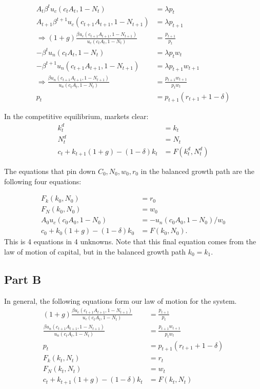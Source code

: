 \documentclass[11pt]{article} %
\begin{document}
\begin{align*}
A_t\beta^tu_c(c_tA_t,1-N_t) &= \lambda p_t\\
A_{t+1}\beta^{t+1}u_c(c_{t+1}A_{t+1},1-N_{t+1}) &= \lambda p_{t+1}\\
\Rightarrow (1+g)\frac{\beta u_c(c_{t+1}A_{t+1},1-N_{t+1})}{ u_c(c_tA_t,1-N_t)} &= \frac{p_{t+1}}{p_t}\\
-\beta^tu_n(c_tA_t,1-N_t) &= \lambda p_tw_t \\
-\beta^{t+1}u_n(c_{t+1}A_{t+1},1-N_{t+1}) &= \lambda p_{t+1}w_{t+1}\\
\Rightarrow \frac{\beta u_n(c_{t+1}A_{t+1},1-N_{t+1}) }{u_n(c_tA_t,1-N_t)} &= \frac{p_{t+1} w_{t+1}}{p_t w_t}\\
p_t &= p_{t+1}(r_{t+1} + 1-\delta)
\end{align*}

In the competitive equilibrium, markets clear:
\begin{align*}
k_t^d &= k_t\\
N_t^d &= N_t\\
c_t + k_{t+1}(1+g) - (1-\delta)k_{t} &= F(k_t^d,N_t^d)
\end{align*}

The equations that pin down $C_0,N_0,w_0,r_0$ in the balanced growth path are the following four equations:

\begin{align*}
F_k(k_0,N_0) &= r_0\\
F_N(k_0,N_0) &= w_0\\
A_0 u_c (c_0 A_0, 1-N_0) &= - u_n (c_0A_0,1-N_0) / w_0\\
c_0 + k_0(1+g) - (1-\delta)k_0 &= F(k_0,N_0).
\end{align*}
This is 4 equations in 4 unknowns. Note that this final equation comes from the law of motion of capital, but in the balanced growth path $k_0 = k_1$.


\subsection{Part B}
In general, the following equations form our law of motion for the system.
\begin{align}
(1+g)\frac{\beta u_c(c_{t+1}A_{t+1},1-N_{t+1})}{ u_c(c_tA_t,1-N_t)} &= \frac{p_{t+1}}{p_t} \label{ceuler} \\
\frac{\beta u_n(c_{t+1}A_{t+1},1-N_{t+1}) }{u_n(c_tA_t,1-N_t)} &= \frac{p_{t+1} w_{t+1}}{p_t w_t}\label{neuler}\\
p_t &= p_{t+1}(r_{t+1} + 1-\delta) \label{arbitrage} \\ 
F_k(k_t,N_t) &= r_t\\
F_N(k_t,N_t) &= w_t \\
c_t + k_{t+1}(1+g) - (1-\delta)k_{t} &= F(k_t,N_t)
\end{align}
\end{document}
